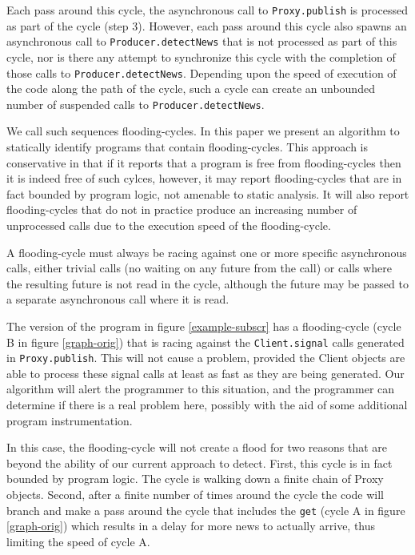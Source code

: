 \documentclass[12pt]{article}%
\begin{document}
\noindent
Each pass around this cycle, the asynchronous call to \lstinline{Proxy.publish} is processed as part of the cycle (step 3).
However, each pass around this cycle also spawns an asynchronous call to  \lstinline{Producer.detectNews} that is not processed as part of this cycle,
nor is there any attempt to synchronize this cycle with the completion of those calls to  \lstinline{Producer.detectNews}.
Depending upon the speed of
execution of the code along the path of the cycle, such a cycle can create an unbounded number of suspended calls to
\lstinline{Producer.detectNews}.

We call such sequences flooding-cycles. In this paper we present an algorithm to statically identify
programs that contain flooding-cycles. This approach is conservative in that if it reports that a program is free from
flooding-cycles then it is indeed free of such cylces, however, it may report flooding-cycles that are in fact bounded by
program logic, not amenable to static analysis. It will also report flooding-cycles that do not in practice produce an
increasing number of unprocessed calls due to the execution speed of the flooding-cycle. 

A flooding-cycle must always be racing against one or more specific asynchronous calls, either trivial calls (no waiting on
any future from the call) or calls where the resulting future is not read in the cycle, although the future may be passed
to a separate asynchronous call where it is read.  

The version of the program in figure \ref{example-subscr} has a flooding-cycle (cycle B in figure \ref{graph-orig}) 
that is racing against the \lstinline{Client.signal} calls
generated in \lstinline{Proxy.publish}. This will not cause a problem, provided the Client objects are able to process these signal
calls at least as fast as they are being generated. Our algorithm will alert the programmer to this situation, and the
programmer can determine if there is a real problem here, possibly with the aid of some additional program
instrumentation.  

In this case, the flooding-cycle will not create a flood for two reasons that are beyond the ability of our current approach to detect.
First, this cycle is in fact bounded by program logic. The cycle is walking down a finite chain of Proxy objects.
Second, after a finite number of times around the cycle the code will branch and make a pass around the cycle that includes the 
\lstinline{get}
(cycle A in figure \ref{graph-orig})
which results in a delay for more news to actually arrive, thus limiting the speed of cycle A.
\end{document}
